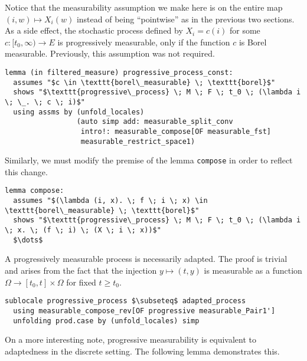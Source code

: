 Notice that the measurability assumption we make here is on the entire map $(i, w) \mapsto X_i(w)$ instead of being ``pointwise'' as in the previous two sections. As a side effect, the stochastic process defined by $X_i = c(i)$ for some $c : [t_0, \infty) \rightarrow E$ is progressively measurable, only if the function $c$ is Borel measurable. Previously, this assumption was not required.

\begin{isalemma}
{\small
\begin{lstlisting}[style=isabelle]
lemma (in filtered_measure) progressive_process_const:
  assumes "$c \in \texttt{borel\_measurable} \; \texttt{borel}$"
  shows "$\texttt{progressive\_process} \; M \; F \; t_0 \; (\lambda i \; \_. \; c \; i)$"
  using assms by (unfold_locales) 
				 (auto simp add: measurable_split_conv 
				  intro!: measurable_compose[OF measurable_fst] 
				  measurable_restrict_space1)
  \end{lstlisting}
}
\end{isalemma}

Similarly, we must modify the premise of the lemma \texttt{compose} in order to reflect this change.

\begin{isalemma}
{\small
\begin{lstlisting}[style=isabelle]
lemma compose:
  assumes "$(\lambda (i, x). \; f \; i \; x) \in \texttt{borel\_measurable} \; \texttt{borel}$"
  shows "$\texttt{progressive\_process} \; M \; F \; t_0 \; (\lambda i \; x. \; (f \; i) \; (X \; i \; x))$"
  $\dots$
  \end{lstlisting}
}
\end{isalemma}

A progressively measurable process is necessarily adapted. The proof is trivial and arises from the fact that the injection $y \mapsto (t, y)$ is measurable as a function $\Omega \rightarrow [t_0, t] \times \Omega$ for fixed $t \ge t_0$.

\begin{isalemma}
{\small
\begin{lstlisting}[style=isabelle]
sublocale progressive_process $\subseteq$ adapted_process 
  using measurable_compose_rev[OF progressive measurable_Pair1'] 
  unfolding prod.case by (unfold_locales) simp
\end{lstlisting}
}
\end{isalemma}

On a more interesting note, progressive measurability is equivalent to adaptedness in the discrete setting. The following lemma demonstrates this.

